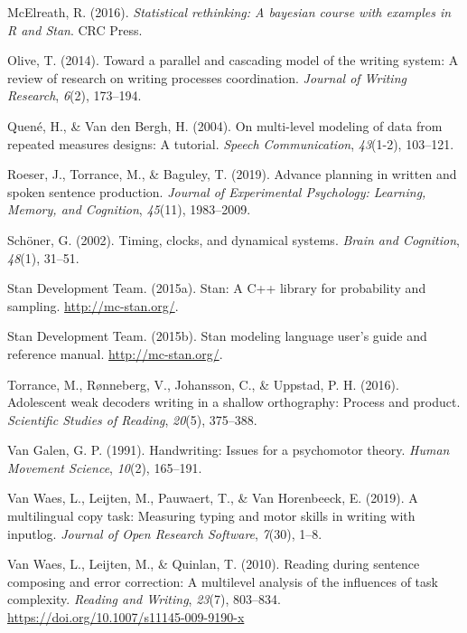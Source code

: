 \documentclass[english,jou,floatsintext]{apa7}
\begin{document}
\leavevmode\hypertarget{ref-mcelreath2016statistical}{}%
McElreath, R. (2016). \emph{Statistical rethinking: A bayesian course with examples in R and Stan}. CRC Press.

\leavevmode\hypertarget{ref-olive2014toward}{}%
Olive, T. (2014). Toward a parallel and cascading model of the writing system: A review of research on writing processes coordination. \emph{Journal of Writing Research}, \emph{6}(2), 173--194.

\leavevmode\hypertarget{ref-quene2004multi}{}%
Quené, H., \& Van den Bergh, H. (2004). On multi-level modeling of data from repeated measures designs: A tutorial. \emph{Speech Communication}, \emph{43}(1-2), 103--121.

\leavevmode\hypertarget{ref-roeser2019advance}{}%
Roeser, J., Torrance, M., \& Baguley, T. (2019). Advance planning in written and spoken sentence production. \emph{Journal of Experimental Psychology: Learning, Memory, and Cognition}, \emph{45}(11), 1983--2009.

\leavevmode\hypertarget{ref-schoner2002timing}{}%
Schöner, G. (2002). Timing, clocks, and dynamical systems. \emph{Brain and Cognition}, \emph{48}(1), 31--51.

\leavevmode\hypertarget{ref-rstan}{}%
Stan Development Team. (2015a). Stan: A C++ library for probability and sampling. \url{http://mc-stan.org/}.

\leavevmode\hypertarget{ref-rstan2}{}%
Stan Development Team. (2015b). Stan modeling language user's guide and reference manual. \url{http://mc-stan.org/}.

\leavevmode\hypertarget{ref-torrance2016adolescent}{}%
Torrance, M., Rønneberg, V., Johansson, C., \& Uppstad, P. H. (2016). Adolescent weak decoders writing in a shallow orthography: Process and product. \emph{Scientific Studies of Reading}, \emph{20}(5), 375--388.

\leavevmode\hypertarget{ref-van1991handwriting}{}%
Van Galen, G. P. (1991). Handwriting: Issues for a psychomotor theory. \emph{Human Movement Science}, \emph{10}(2), 165--191.

\leavevmode\hypertarget{ref-van2019multilingual}{}%
Van Waes, L., Leijten, M., Pauwaert, T., \& Van Horenbeeck, E. (2019). A multilingual copy task: Measuring typing and motor skills in writing with inputlog. \emph{Journal of Open Research Software}, \emph{7}(30), 1--8.

\leavevmode\hypertarget{ref-van2010reading}{}%
Van Waes, L., Leijten, M., \& Quinlan, T. (2010). Reading during sentence composing and error correction: A multilevel analysis of the influences of task complexity. \emph{Reading and Writing}, \emph{23}(7), 803--834. \url{https://doi.org/10.1007/s11145-009-9190-x}
\end{document}
